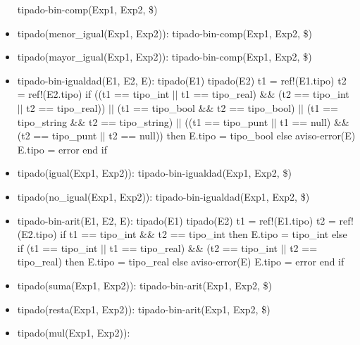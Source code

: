 \documentclass[11pt]{article}
\begin{document}
\begin{itemize}
                \subitem tipado-bin-comp(Exp1, Exp2, \$)
            \item tipado(menor\_igual(Exp1, Exp2)): 
                \subitem tipado-bin-comp(Exp1, Exp2, \$)
            \item tipado(mayor\_igual(Exp1, Exp2)): 
                \subitem tipado-bin-comp(Exp1, Exp2, \$)
            \item tipado-bin-igualdad(E1, E2, E): 
                \subitem tipado(E1) 
                \subitem tipado(E2) 
                \subitem t1 = ref!(E1.tipo) 
                \subitem t2 = ref!(E2.tipo) 
                \subitem if ((t1 == tipo\_int $\vert \vert$ t1 == tipo\_real) \&\&  (t2 == tipo\_int $\vert \vert$ t2 == tipo\_real)) $\vert \vert$ 
                    (t1 == tipo\_bool \&\&  t2 == tipo\_bool) $\vert \vert$ 
                    (t1 == tipo\_string \&\&  t2 == tipo\_string) $\vert \vert$ 
                    ((t1 == tipo\_punt $\vert \vert$ t1 == null) \&\&  (t2 == tipo\_punt $\vert \vert$ t2 == null)) then
                    \subsubitem E.tipo = tipo\_bool
                \subitem else
                    \subsubitem aviso-error(E)
                    \subsubitem E.tipo = error
                \subitem end if
            \item tipado(igual(Exp1, Exp2)): 
                \subitem tipado-bin-igualdad(Exp1, Exp2, \$)
            \item tipado(no\_igual(Exp1, Exp2)): 
                \subitem tipado-bin-igualdad(Exp1, Exp2, \$)
            \item tipado-bin-arit(E1, E2, E): 
                \subitem tipado(E1) 
                \subitem tipado(E2) 
                \subitem t1 = ref!(E1.tipo) 
                \subitem t2 = ref!(E2.tipo) 
                \subitem if t1 == tipo\_int \&\&  t2 == tipo\_int then
                    \subsubitem E.tipo = tipo\_int
                \subitem else if (t1 == tipo\_int $\vert \vert$ t1 == tipo\_real) \&\&  (t2 == tipo\_int $\vert \vert$ t2 == tipo\_real) then
                    \subsubitem E.tipo = tipo\_real
                \subitem else 
                    \subsubitem aviso-error(E)
                    \subsubitem E.tipo = error
                \subitem end if
            \item tipado(suma(Exp1, Exp2)): 
                \subitem tipado-bin-arit(Exp1, Exp2, \$)
            \item tipado(resta(Exp1, Exp2)): 
                \subitem tipado-bin-arit(Exp1, Exp2, \$)
            \item tipado(mul(Exp1, Exp2)): 

\end{itemize}
\end{document}
